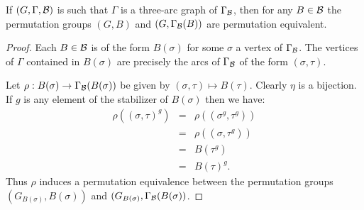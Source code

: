 



\begin{proposition}

If $(G,\Gamma, \mathcal{B})$ is such that $\Gamma$ is a three-arc graph
of $\Gamma_{\mathcal{B}}$, then for any $B \in \mathcal{B}$
the permutation groups $(G, B)$ and $(G, \Gamma_{\mathcal{B}}(B))$
are permutation equivalent.  

\begin{proof}
Each $B \in \mathcal{B}$ is of the form $B(\sigma)$ for some
$\sigma$ a vertex of $\Gamma_{\mathcal{B}}$.
The vertices of $\Gamma$ contained in $B(\sigma)$ 
are precisely the arcs of $\Gamma_{\mathcal{B}}$
of the form $(\sigma, \tau)$.

Let $\rho : B(\sigma) \to \Gamma_{\mathcal{B}}(B(\sigma))$ be given by 
$(\sigma,\tau) \mapsto B(\tau)$.
Clearly $\eta$ is a bijection.
If $g$ is any element of the stabilizer of $B(\sigma)$ 
then we have:
\begin{eqnarray*}
\rho((\sigma,\tau)^g) & = & \rho((\sigma^g,\tau^g)) \\
                      & = & \rho((\sigma,\tau^g))   \\
		      & = & B(\tau^g)               \\
		      & = & B(\tau)^g.
\end{eqnarray*}
Thus $\rho$ induces a permutation equivalence between the permutation groups
$(G_{B(\sigma)}, B(\sigma))$ and $(G_{B(\sigma)}, \Gamma_{\mathcal{B}}(B(\sigma))$.

\end{proof}
\end{proposition}

